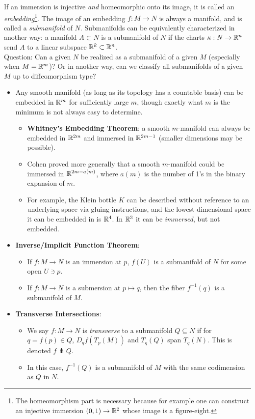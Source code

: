 \documentclass{amsart}
\begin{document}
If an immersion is injective \textit{and} homeomorphic onto its image, it is called an \textit{embedding}\footnote{The homeomorphism part is necessary because for example one can construct an injective immersion $(0,1)\to \mathbb{R}^2$ whose image is a figure-eight.}. The image of an embedding $f:M\to N$ is always a manifold, and is called a \textit{submanifold} of $N$. Submanifolds can be equivalently characterized in another way: a manifold $A\subset N$ is a submanifold of $N$ if the charts $\kappa:N\to \mathbb{R}^n$ send $A$ to a linear subspace $\mathbb{R}^k\subset \mathbb{R}^n$.\\

Question: Can a given $N$ be realized as a submanifold of a given $M$ (especially when $M=\mathbb{R}^m$)? Or in another way, can we classify all submanifolds of a given $M$ up to diffeomorphism type?
\begin{itemize}
	\item Any smooth manifold (as long as its topology has a countable basis) can be embedded in $\mathbb{R}^m$ for sufficiently large $m$, though exactly what $m$ is the minimum is not always easy to determine. 
	\begin{itemize} 
		\item \textbf{Whitney's Embedding Theorem}: a smooth $m$-manifold can always be embedded in $\mathbb{R}^{2m}$ and immersed in $\mathbb{R}^{2m-1}$ (smaller dimensions may be possible). 
		\item Cohen proved more generally that a smooth $m$-manifold could be immersed in $\mathbb{R}^{2m-a(m)}$, where $a(m)$ is the number of 1's in the binary expansion of $m$.
		\item For example, the Klein bottle $K$ can be described without reference to an underlying space via gluing instructions, and the lowest-dimensional space it can be embedded in is $\mathbb{R}^4$. In $\mathbb{R}^3$ it can be \textit{immersed}, but not embedded.
	\end{itemize}
\item \textbf{Inverse/Implicit Function Theorem}:
\begin{itemize}
	\item If $f:M\to N$ is an immersion at $p$, $f(U)$ is a submanifold of $N$ for some open $U\ni p$.
	\item If $f:M\to N$ is a submersion at $p\mapsto q$, then the fiber $f^{-1}(q)$ is a submanifold of $M$.
\end{itemize}
\item \textbf{Transverse Intersections}:
\begin{itemize}
	\item We say $f:M\to N$ is \textit{transverse} to a submanifold $Q\subseteq N$ if for $q=f(p)\in Q$, $D_qf(T_p(M))$ and $T_q(Q)$ span $T_q(N)$. This is denoted $f\pitchfork Q$.
	\item In this case, $f^{-1}(Q)$ is a submanifold of $M$ with the same codimension as $Q$ in $N$.\\
\end{itemize}
\end{itemize}
\end{document}
